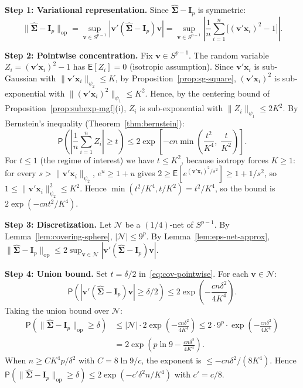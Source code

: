 \documentclass[12pt,a4paper]{article}
\makeatletter
\theoremstyle{definition}
\renewenvironment{proof}[1][\proofname]{\par
  \pushQED{\qed}%
  \normalfont \topsep6\p@\@plus6\p@\relax
  \trivlist
  \item[\hskip\labelsep\bfseries #1\@addpunct{.}]\ignorespaces
}{%
  \popQED\endtrivlist\@endpefalse
}
\newcommand\expc{\mathsf{E}}
\newcommand\prb{\mathsf{P}}
\newcommand{\bx}{\mathbf{x}}
\newcommand{\bI}{\mathbf{I}}
\newcommand{\bv}{\mathbf{v}}
\newcommand{\calN}{\mathcal{N}}
\newcommand{\hbSigma}{\hat{\boldsymbol{\Sigma}}}
\newcommand{\opnorm}[1]{\|#1\|_{\mathrm{op}}}
\makeatother
\begin{document}
\begin{proof}
\textbf{Step 1: Variational representation.} Since $\hbSigma - \bI_p$ is symmetric:
\[
\opnorm{\hbSigma - \bI_p} = \sup_{\bv \in S^{p-1}} |\bv'(\hbSigma - \bI_p)\bv| = \sup_{\bv \in S^{p-1}}\left|\frac{1}{n}\sum_{i=1}^n \bigl[(\bv'\bx_i)^2 - 1\bigr]\right|.
\]

\textbf{Step 2: Pointwise concentration.} Fix $\bv \in S^{p-1}$. The random variable $Z_i = (\bv'\bx_i)^2 - 1$ has $\expc[Z_i] = 0$ (isotropic assumption). Since $\bv'\bx_i$ is sub-Gaussian with $\|\bv'\bx_i\|_{\psi_2} \leqslant K$, by Proposition~\ref{prop:sg-square}, $(\bv'\bx_i)^2$ is sub-exponential with $\|(\bv'\bx_i)^2\|_{\psi_1} \leqslant K^2$. Hence, by the centering bound of Proposition~\ref{prop:subexp-mgf}(i), $Z_i$ is sub-exponential with $\|Z_i\|_{\psi_1} \leqslant 2K^2$. By Bernstein's inequality (Theorem~\ref{thm:bernstein}):
\begin{equation}\label{eq:cov-pointwise}
\prb\!\left(\left|\frac{1}{n}\sum_{i=1}^n Z_i\right| \geqslant t\right) \leqslant 2\exp\!\left[-cn\min\!\left(\frac{t^2}{K^4},\; \frac{t}{K^2}\right)\right].
\end{equation}
For $t \leqslant 1$ (the regime of interest) we have $t \leqslant K^2$, because isotropy forces $K \geqslant 1$: for every $s > \|\bv'\bx_i\|_{\psi_2}$, $e^u \geqslant 1 + u$ gives $2 \geqslant \expc[e^{(\bv'\bx_i)^2/s^2}] \geqslant 1 + 1/s^2$, so $1 \leqslant \|\bv'\bx_i\|_{\psi_2}^2 \leqslant K^2$. Hence $\min(t^2/K^4, t/K^2) = t^2/K^4$, so the bound is $2\exp(-cnt^2/K^4)$.

\textbf{Step 3: Discretization.} Let $\calN$ be a $(1/4)$-net of $S^{p-1}$. By Lemma~\ref{lem:covering-sphere}, $|\calN| \leqslant 9^p$. By Lemma~\ref{lem:eps-net-approx}, $\opnorm{\hbSigma - \bI_p} \leqslant 2\sup_{\bv \in \calN} |\bv'(\hbSigma - \bI_p)\bv|$.

\textbf{Step 4: Union bound.} Set $t = \delta/2$ in~\eqref{eq:cov-pointwise}. For each $\bv \in \calN$:
\[
\prb\!\left(|\bv'(\hbSigma - \bI_p)\bv| \geqslant \delta/2\right) \leqslant 2\exp\!\left(-\frac{cn\delta^2}{4K^4}\right).
\]
Taking the union bound over $\calN$:
\begin{align*}
\prb\!\left(\opnorm{\hbSigma - \bI_p} \geqslant \delta\right) &\leqslant |\calN|\cdot 2\exp\!\left(-\frac{cn\delta^2}{4K^4}\right) \leqslant 2\cdot 9^p\cdot\exp\!\left(-\frac{cn\delta^2}{4K^4}\right)\\
&= 2\exp\!\left(p\ln 9 - \frac{cn\delta^2}{4K^4}\right).
\end{align*}
When $n \geqslant CK^4 p/\delta^2$ with $C = 8\ln 9/c$, the exponent is $\leqslant -cn\delta^2/(8K^4)$. Hence $\prb(\opnorm{\hbSigma - \bI_p} \geqslant \delta) \leqslant 2\exp(-c'\delta^2 n/K^4)$ with $c' = c/8$.
\end{proof}
\end{document}
